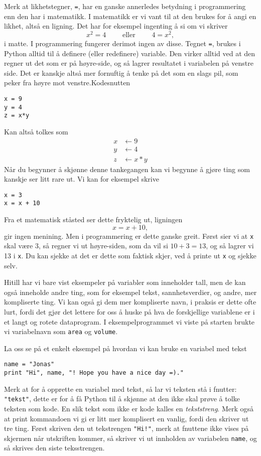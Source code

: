 \documentclass[a4paper, 11pt, notitlepage, english]{article}
\begin{document}
Merk at likhetstegner, \verb+=+, har en ganske annerledes betydning i programmering enn den har i matematikk. I matematikk er vi vant til at den brukes for å angi en likhet, altså en ligning. Det har for eksempel ingenting å si om vi skriver
$$x^2 = 4 \qquad \mbox{ eller } \qquad 4 = x^2,$$ 
i matte. I programmering fungerer derimot ingen av disse. Tegnet \verb+=+, brukes i Python alltid til å definere (eller redefinere) variable. Den virker alltid ved at den regner ut det som er på høyre-side, og så lagrer resultatet i variabelen på venstre side. Det er kanskje altså mer fornuftig å tenke på det som en slags pil, som peker fra høyre mot venstre.Kodesnutten
\begin{lstlisting}
x = 9
y = 4
z = x*y
\end{lstlisting}
\vspace{-0.3cm}
Kan altså tolkes som
\begin{align*}
x &\leftarrow 9 \\
y &\leftarrow 4 \\
z &\leftarrow x*y
\end{align*}
Når du begynner å skjønne denne tankegangen kan vi begynne å gjøre ting som kanskje ser litt rare ut. Vi kan for eksempel skrive
\begin{lstlisting}
x = 3
x = x + 10
\end{lstlisting}
\vspace{-0.3cm}
Fra et matematisk ståsted ser dette fryktelig ut, ligningen
$$x = x+10,$$
gir ingen menining. Men i programmering er dette ganske greit. Først sier vi at \verb+x+ skal være 3, så regner vi ut høyre-siden, som da vil si $10+3 = 13$, og så lagrer vi 13 i \verb+x+. Du kan sjekke at det er dette som faktisk skjer, ved å printe ut \verb+x+ og sjekke selv.

Hitill har vi bare vist eksempeler på variabler som inneholder tall, men de kan også inneholde andre ting, som for eksempel tekst, sannhetsverdier, og andre, mer kompliserte ting. Vi kan også gi dem mer kompliserte navn, i praksis er dette ofte lurt, fordi det gjør det lettere for oss å huske på hva de forskjellige variablene er i et langt og rotete dataprogram. I eksempelprogrammet vi viste på starten brukte vi variabelnavn som \verb+area+ og \verb+volume+.

La oss se på et enkelt eksempel på hvordan vi kan bruke en variabel med tekst
\begin{lstlisting}
name = "Jonas"
print "Hi", name, "! Hope you have a nice day =)."
\end{lstlisting}
\vspace{-0.3cm}
Merk at for å opprette en variabel med tekst, så lar vi teksten stå i fnutter: \verb+"tekst"+, dette er for å få Python til å skjønne at den ikke skal prøve å tolke teksten som kode. En slik tekst som ikke er kode kalles en \emph{tekststreng}. Merk også at print kommandoen vi gi er litt mer komplisert en vanlig, fordi den skriver ut tre ting. Først skriven den ut tekstrengen \verb+"Hi!"+, merk at fnuttene ikke vises på skjermen når utskriften kommer, så skriver vi ut innholden av variabelen \verb+name+, og så skrives den siste teksstrengen.
\end{document}
